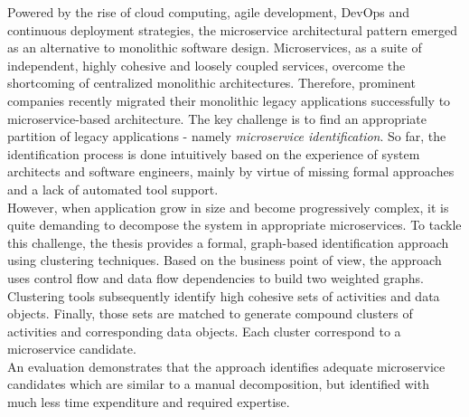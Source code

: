 

\Abstract
Powered by the rise of cloud computing, agile development, DevOps and continuous deployment strategies, the microservice architectural pattern emerged as an alternative to monolithic software design. Microservices, as a suite of independent, highly cohesive and loosely coupled services, overcome the shortcoming of centralized monolithic architectures. Therefore, prominent companies recently migrated their monolithic legacy applications successfully to microservice-based architecture. The key challenge is to find an appropriate partition of legacy applications - namely \textit{microservice identification}. So far, the identification process is done intuitively based on the experience of system architects and software engineers, mainly by virtue of missing formal approaches and a lack of automated tool support. \\
However, when application grow in size and become progressively complex, it is quite demanding to decompose the system in appropriate microservices.
To tackle this challenge, the thesis provides a formal, graph-based identification approach using clustering techniques. Based on the business point of view, the approach uses control flow and data flow dependencies to build two weighted graphs. Clustering tools subsequently identify high cohesive sets of activities and data objects. Finally, those sets are matched to generate compound clusters of activities and corresponding data objects. Each cluster correspond to a microservice candidate. \\
An evaluation demonstrates that the approach identifies adequate microservice candidates which are similar to a manual decomposition, but identified with much less time expenditure and required expertise.


